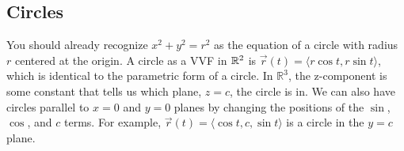 \subsection{Circles}
\noindent
You should already recognize $x^2 + y^2 = r^2$ as the equation of a circle with radius $r$ centered at the origin.
A circle as a VVF in $\mathbb{R}^2$ is $\vec{r}(t) = \langle r\cos{t}, r\sin{t} \rangle$, which is identical to the parametric form of a circle.
In $\mathbb{R}^3$, the z-component is some constant that tells us which plane, $z=c$, the circle is in.
We can also have circles parallel to $x=0$ and $y=0$ planes by changing the positions of the $\sin$, $\cos$, and $c$ terms.
For example, $\vec{r}(t) = \langle \cos{t}, c, \sin{t} \rangle$ is a circle in the $y=c$ plane.